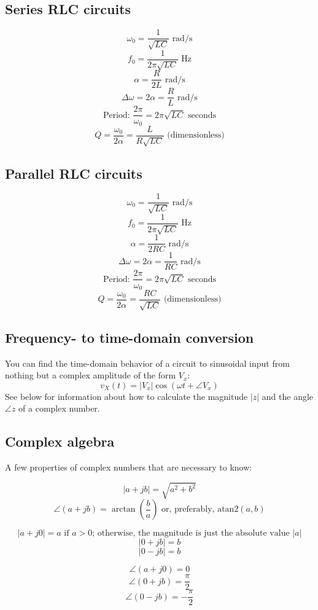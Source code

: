 \documentclass[12pt,a4paper]{report}
\begin{document}
\subsection{Series RLC circuits}

\[ \omega_0 = \frac{1}{\sqrt{LC}} \text{ rad/s} \]
\[ f_0 = \frac{1}{2\pi \sqrt{LC}} \text { Hz} \]
\[ \alpha = \frac{R}{2L} \text{ rad/s} \]
\[ \Delta \omega = 2\alpha = \frac{R}{L} \text { rad/s} \]
\[ \text{Period: } \frac{2\pi}{\omega_0} = 2\pi \sqrt{LC} \text { seconds} \]
\[ Q = \frac{\omega_0}{2\alpha} = \frac{L}{R\sqrt{LC}} \text { (dimensionless)} \]

\subsection{Parallel RLC circuits}

\[ \omega_0 = \frac{1}{\sqrt{LC}} \text{ rad/s} \]
\[ f_0 = \frac{1}{2\pi \sqrt{LC}} \text { Hz} \]
\[ \alpha = \frac{1}{2RC} \text{ rad/s} \]
\[ \Delta \omega = 2\alpha = \frac{1}{RC} \text { rad/s} \]
\[ \text{Period: } \frac{2\pi}{\omega_0} = 2\pi \sqrt{LC} \text { seconds} \]
\[ Q = \frac{\omega_0}{2\alpha} = \frac{RC}{\sqrt{LC}} \text { (dimensionless)} \]

\subsection{Frequency- to time-domain conversion}
You can find the time-domain behavior of a circuit to sinusoidal input from nothing but a complex amplitude of the form $V_x$:
\[ v_X(t) = |V_x| \cos{(\omega t + \angle V_x)} \]
See below for information about how to calculate the magnitude $|z|$ and the angle $\angle z$ of a complex number.

\subsection{Complex algebra}
A few properties of complex numbers that are necessary to know:

\[ |a + jb| = \sqrt{a^2 + b^2} \]
\[ \angle (a + jb) = \arctan{(\frac{b}{a})} \text{ or, preferably, } \text{atan2}(a, b) \]

\[ |a + j0| = a \text { if $a > 0$; otherwise, the magnitude is just the absolute value } |a| \]
\[ |0 + jb| = b \]
\[ |0 - jb| = b \]

\[ \angle (a + j0) = 0 \]
\[ \angle (0 + jb) = \frac{\pi}{2} \]
\[ \angle (0 - jb) = -\frac{\pi}{2} \]
\end{document}
